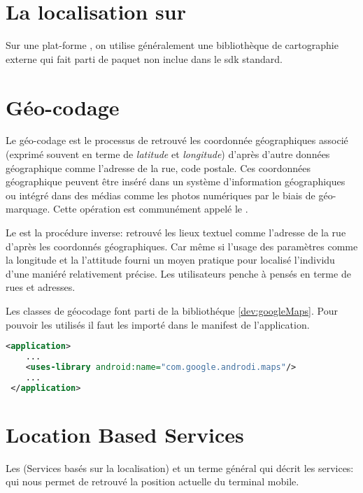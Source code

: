 \section{La localisation sur \android}%
Sur une plat-forme \android, on utilise généralement une bibliothèque de cartographie externe  qui fait parti de paquet  non inclue dans le \gls{sdk} standard.

\section{Géo-codage}
Le géo-codage est le processus de retrouvé les coordonnée géographiques associé (exprimé souvent en terme de \textit{latitude} et \textit{longitude}) d'après d'autre données géographique comme l’adresse de la rue, code postale. Ces coordonnées géographique peuvent être inséré dans un système d'information géographiques ou intégré dans des médias comme les photos numériques par le biais de géo-marquage. Cette opération est communément appelé le .

Le  est la procédure inverse: retrouvé les lieux textuel comme l'adresse de la rue d'après les coordonnés géographiques. Car même si l'usage des paramètres comme la longitude et la l'attitude fourni un moyen pratique pour localisé l'individu d'une maniéré relativement précise. Les utilisateurs penche à pensés en terme de rues et adresses.
\cite{wiki:geocoding}

Les classes de géocodage font parti de la bibliothéque  \ref{dev:googleMaps}. Pour pouvoir les utilisés il faut les importé dans le manifest de l'application.
 \begin{lstlisting}[language=xml, caption=Importé la bibliothéque GoogleMaps.]
 <application>
 	...
 	<uses-library android:name="com.google.androdi.maps"/>
 	...
 </application>
 \end{lstlisting}
\section{Location Based Services}%
Les  (Services basés sur la localisation) et un terme général qui décrit les services: qui nous permet de retrouvé la position actuelle du terminal mobile.

